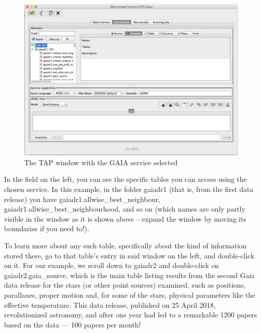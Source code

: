 \documentclass[twocolumn,apj]{openjournal}
\begin{document}
\begin{figure}[htbp]
\begin{center}
\includegraphics[width=\linewidth]{gaia-chosen.png}
\caption{The TAP window with the GAIA service selected}
\label{TAPWindowSelected}
\end{center}
\end{figure}
In the field on the left, you can see the specific tables you can access using the chosen service. In this example, in the folder gaiadr1 (that is, from the first data release) you have gaiadr1.allwise\_best\_neighbour, gaiadr1.allwise\_best\_neighbourhood, and so on (which names are only partly visible in the window as it is shown above -- expand the window by moving its boundaries if you need to!).

To learn more about any such table, specifically about the kind of information stored there, go to that table's entry in said window on the left, and double-click on it. For our example, we scroll down to gaiadr2 and double-click on gaiadr2.gaia\_source, which is the main table listing results from the second Gaia data release for the stars (or other point sources) examined, such as positions, parallaxes, proper motion and, for some of the stars, physical parameters like the effective temperature. This data release, published on 25 April 2018, revolutionized astronomy, and after one year had led to a remarkable 1200 papers based on the data --- 100 papers per month!
\end{document}

